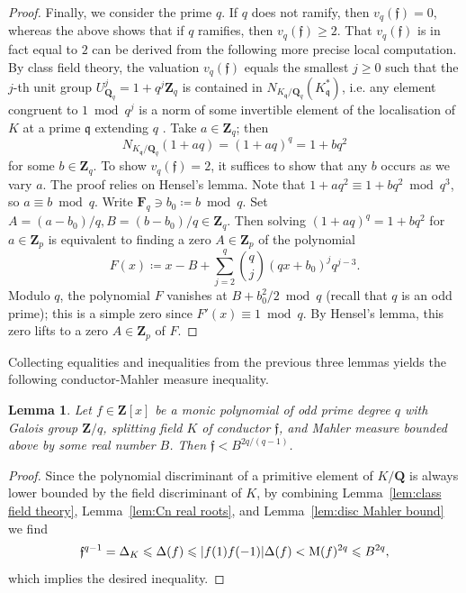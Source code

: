 \documentclass[12pt,reqno]{amsart}
\theoremstyle{definition}
\theoremstyle{plain}
\newtheorem{lemma}[theorem]{Lemma}
\theoremstyle{definition}
\newcommand{\mf}{\mathfrak}
\newcommand{\Z}{\mathbf{Z}}
\newcommand{\Q}{\mathbf{Q}}
\newcommand{\FF}{\mathbf{F}}
\newcommand{\MM}{\mathrm{M}}
\renewcommand{\geq}{\geqslant}
\renewcommand{\leq}{\leqslant}
\DeclarePairedDelimiter\abs{\lvert}{\rvert}
\begin{document}
\begin{proof}
Finally, we consider the prime $q$. If $q$ does not ramify, then $v_q(\mf{f}) = 0$, whereas the above shows that if $q$ ramifies, then $v_q(\mf{f}) \geq 2$. That $v_q(\mf{f})$ is in fact equal to $2$ can be derived from the following more precise local computation. By class field theory, the valuation $v_q(\mf{f})$ equals the smallest $j \geq 0$ such that the $j$-th unit group $U_{\Q_q}^j = 1 + q^j\Z_q$ is contained in $N_{K_{\mf{q}}/\Q_q}(K_{\mf{q}}^*)$, i.e. any element congruent to $1 \bmod{q^j}$ is a norm of some invertible element of the localisation of $K$ at a prime $\mf{q}$ extending $q$ \cite[Chapter~V, Definition~1.6]{Neukirch}. Take $a \in \Z_q$; then $$N_{K_{\mf{q}}/\Q_q}(1+aq) = (1+aq)^q = 1 + bq^2$$ for some $b \in \Z_q$. 
To show $v_q(\mf{f}) = 2$, it suffices to show that any $b$ occurs as we vary $a$. The proof relies on Hensel's lemma. Note that $1+aq^2 \equiv 1+bq^2 \bmod{q^3}$, so $a \equiv b \bmod{q}$. Write $\FF_q \ni b_0 \coloneqq  b \bmod{q}$. Set $A = (a-b_0)/q, B = (b-b_0)/q \in \Z_q$. Then solving $(1+aq)^q = 1+bq^2$ for $a \in \Z_p$ is equivalent to finding a zero $A \in \Z_p$ of the polynomial
\begin{equation*}
F(x) \coloneqq  x-B + \sum_{j=2}^q \binom{q}{j} (qx+b_0)^jq^{j-3}.
\end{equation*}
Modulo $q$, the polynomial $F$ vanishes at $B + b_0^2/2 \bmod{q}$ (recall that $q$ is an odd prime); this is a simple zero since $F'(x) \equiv 1 \bmod{q}$. By Hensel's lemma, this zero lifts to a zero $A \in \Z_p$ of $F$.
\end{proof}

Collecting equalities and inequalities from the previous three lemmas yields the following conductor-Mahler measure inequality.
\begin{lemma}
\label{lem:conductor Mahler bound}
Let $f \in \Z[x]$ be a monic polynomial of odd prime degree $q$ with Galois group $\Z/q$, splitting field $K$ of conductor $\mf{f}$, and Mahler measure bounded above by some real number $B$. Then $\mf{f} < B^{2q/(q-1)}$.  
\end{lemma}
\begin{proof} Since the polynomial discriminant of a primitive element of $K/\Q$ is always lower bounded by the field discriminant of $K$, by combining 
Lemma~\ref{lem:class field theory}, Lemma~\ref{lem:Cn real roots}, and Lemma~\ref{lem:disc Mahler bound} we find  
\[
\mf{f}^{q-1} = \Delta_K \leq \Delta(f) \leq \abs{f(1)f(-1)}\Delta(f) < \MM(f)^{2q} \leq B^{2q}, 
\] 
which implies the desired inequality. 
\end{proof}
\end{document}
